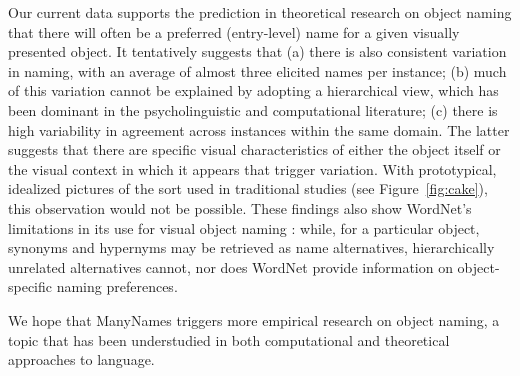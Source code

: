 Our current data supports the prediction in theoretical research on object naming that there will often be a preferred (entry-level) name for a given visually presented object.
It tentatively suggests that (a) there is also consistent variation in naming, with an average of almost three elicited names per instance; (b) much of this variation cannot be explained by adopting a hierarchical view, which has been dominant in the psycholinguistic and computational literature; (c) there is high variability in agreement across instances within the same domain.
The latter suggests that there are specific visual characteristics of either the object itself or the visual context in which it appears that trigger variation. With prototypical, idealized pictures of the sort used in traditional studies (see Figure\ \ref{fig:cake}), this observation would not be possible.
%
These findings also show WordNet's limitations in its use for  visual object naming \cite[a.o.]{Ordonez:2016}: while, for a particular object, synonyms and hypernyms may be retrieved as name alternatives, hierarchically unrelated alternatives cannot, nor does WordNet provide information on object-specific naming preferences. 

We hope that ManyNames triggers more empirical research on object naming, a topic that has been understudied in both computational and theoretical approaches to language.

